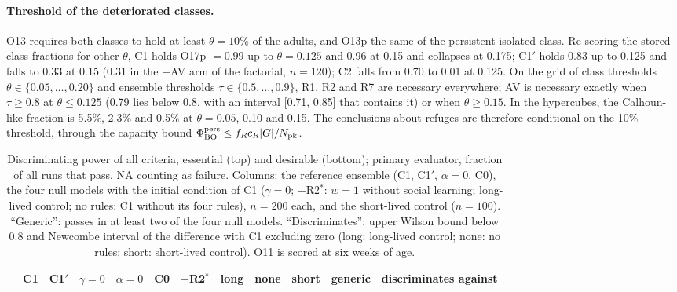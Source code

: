 \documentclass[pre,onecolumn,superscriptaddress,notitlepage]{revtex4-2}
\begin{document}
\paragraph{Threshold of the deteriorated classes.}
O13 requires both classes to hold at least $\theta=10\%$ of the adults, and O13p the same of the persistent
isolated class. Re-scoring the stored class fractions for other $\theta$, \textsf{C1} holds O17p $=0.99$ up to
$\theta=0.125$ and 0.96 at 0.15 and collapses at 0.175; \textsf{C1}$'$ holds 0.83 up to 0.125 and falls to 0.33 at
0.15 (0.31 in the $-$AV arm of the factorial, $n=120$); \textsf{C2} falls from 0.70 to 0.01 at 0.125. On the grid of
class thresholds $\theta\in\{0.05,\dots,0.20\}$ and ensemble thresholds $\tau\in\{0.5,\dots,0.9\}$, R1, R2 and R7
are necessary everywhere; AV is necessary exactly when $\tau\ge0.8$ at $\theta\le0.125$ (0.79 lies below 0.8, with
an interval [0.71, 0.85] that contains it) or when $\theta\ge0.15$. In the hypercubes, the Calhoun-like fraction is
5.5\%, 2.3\% and 0.5\% at $\theta=0.05$, 0.10 and 0.15. The conclusions about refuges are therefore conditional on
the 10\% threshold, through the capacity bound $\Phi^{\rm pers}_{\rm BO}\le f_Rc_R|G|/N_{\rm pk}$.

\begin{table}[ht]
\centering
\caption{Discriminating power of all criteria, essential (top) and desirable (bottom); primary evaluator, fraction
of all runs that pass, NA counting as failure. Columns: the reference ensemble (\textsf{C1}, \textsf{C1}$'$,
$\alpha=0$, \textsf{C0}), the four null models with the initial condition of \textsf{C1} ($\gamma=0$; $-$R2$^*$:
$w=1$ without social learning; long-lived control; no rules: \textsf{C1} without its four rules), $n=200$ each, and
the short-lived control ($n=100$).
``Generic'': passes in at least two of the four null models. ``Discriminates'': upper Wilson bound below 0.8 and
Newcombe interval of the difference with \textsf{C1} excluding zero (long: long-lived control; none: no rules;
short: short-lived control). O11 is scored at six weeks of age.}
\label{tab:res-null-full}
\footnotesize
\setlength{\tabcolsep}{3.2pt}
\begin{tabular}{@{}lccccccccccl@{}}
\toprule
& \textsf{C1} & \textsf{C1}$'$ & $\gamma{=}0$ & $\alpha{=}0$ & \textsf{C0} & $-$R2$^*$ & long & none & short & generic & discriminates against \\
\midrule

\end{tabular}
\end{table}
\end{document}
